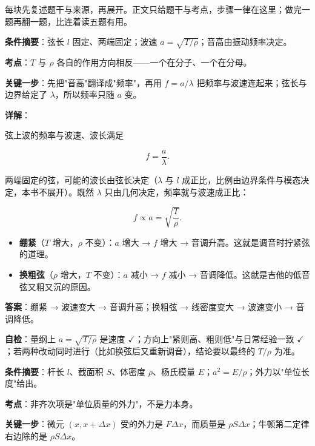 \clearpage
{}\label{sec:answers}

每块先复述题干与来源，再展开。正文只给题干与考点，步骤一律在这里；做完一题再翻一题，比连着读五题有用。


\textbf{条件摘要}：弦长 $l$ 固定、两端固定；波速 $a=\sqrt{T/\rho}$；音高由振动频率决定。

\textbf{考点}：$T$ 与 $\rho$ 各自的作用方向相反——一个在分子、一个在分母。

\textbf{关键一步}：先把"音高"翻译成"频率"，再用 $f=a/\lambda$ 把频率与波速连起来；弦长与边界给定了 $\lambda$，所以频率只随 $a$ 变。

\textbf{详解}：

弦上波的频率与波速、波长满足

\[
f=\frac{a}{\lambda}.
\]

两端固定的弦，可能的波长由弦长决定（$\lambda$ 与 $l$ 成正比，比例由边界条件与模态决定，本书不展开）。既然 $\lambda$ 只由几何决定，频率就与波速成正比：

\[
f\propto a=\sqrt{\frac{T}{\rho}}.
\]

\begin{itemize}
\item \textbf{绷紧}（$T$ 增大，$\rho$ 不变）：$a$ 增大 → $f$ 增大 → 音调升高。这就是调音时拧紧弦的道理。
\item \textbf{换粗弦}（$\rho$ 增大，$T$ 不变）：$a$ 减小 → $f$ 减小 → 音调降低。这就是吉他的低音弦又粗又沉的原因。
\end{itemize}

\textbf{答案}：绷紧 → 波速变大 → 音调升高；换粗弦 → 线密度变大 → 波速变小 → 音调降低。

\textbf{自检}：量纲上 $a=\sqrt{T/\rho}$ 是速度 $\checkmark$；方向上"紧则高、粗则低"与日常经验一致 $\checkmark$；若两种改动同时进行（比如换弦后又重新调音），结论要以最终的 $T/\rho$ 为准。

\qbreak

\textbf{条件摘要}：杆长 $l$、截面积 $S$、体密度 $\rho$、杨氏模量 $E$；$a^2=E/\rho$；外力以"单位长度"给出。

\textbf{考点}：非齐次项是"单位质量的外力"，不是力本身。

\textbf{关键一步}：微元 $(x,x+\Delta x)$ 受的外力是 $F\Delta x$，而质量是 $\rho S\Delta x$；牛顿第二定律右边除的是 $\rho S\Delta x$。

